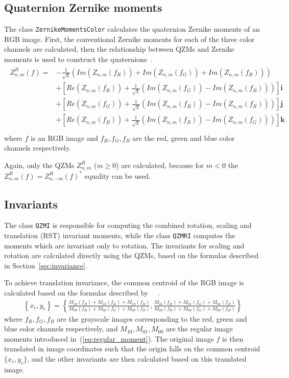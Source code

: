 \subsection{Quaternion Zernike moments}
The class \texttt{ZernikeMomentsColor} calculates the quaternion Zernike moments of an RGB image. First, the conventional Zernike moments for each of the three color channels are calculated, then the relationship between QZMs and Zernike moments is used to construct the quaternions~\cite{qzmi}.
\begin{gather*}
    \begin{split}
        Z_{n,m}^R(f) = &-\frac{1}{\sqrt{3}}\left( Im(Z_{n,m}(f_R)) + Im(Z_{n,m}(f_G)) + Im(Z_{n,m}(f_B)) \right)\\
        &+\left[Re(Z_{n,m}(f_R)) + \frac{1}{\sqrt{3}}\left(Im(Z_{n,m}(f_G)) - Im(Z_{n,m}(f_B))\right)\right]\bm{i}\\
        &+\left[Re(Z_{n,m}(f_G)) + \frac{1}{\sqrt{3}}\left(Im(Z_{n,m}(f_B)) - Im(Z_{n,m}(f_R))\right)\right]\bm{j}\\
        &+\left[Re(Z_{n,m}(f_B)) + \frac{1}{\sqrt{3}}\left(Im(Z_{n,m}(f_R)) - Im(Z_{n,m}(f_G))\right)\right]\bm{k}\\
    \end{split}
\end{gather*}
where $f$ is an RGB image and $f_R, f_G, f_B$ are the red, green and blue color channels respectively.

Again, only the QZMs $Z_{n,m}^R$ ($m \geq 0$) are calculated, because for $m < 0$ the $Z_{n,m}^R(f) = Z_{n,-m}^R(f)^{*}$ equality can be used.

\subsection{Invariants}
The class \texttt{QZMI} is responsible for computing the combined rotation, scaling and translation (RST) invariant moments, while the class \texttt{QZMRI} computes the moments which are invariant only to rotation.
The invariants for scaling and rotation are calculated directly using the QZMs, based on the formulas described in Section~\ref{sec:invariance}.

To achieve translation invariance, the common centroid of the RGB image is calculated based on the formulas described by ~\citeauthor{affine_color}~\cite{affine_color}.
\begin{gather*}
    \left\{x_c,y_c\right\} = \left\{\frac{M_{10}(f_R)+M_{10}(f_G)+M_{10}(f_B)}{M_{00}(f_R)+M_{00}(f_G)+M_{00}(f_B)}, \frac{M_{01}(f_R)+M_{01}(f_G)+M_{01}(f_B)}{M_{00}(f_R)+M_{00}(f_G)+M_{00}(f_B)}\right\}
\end{gather*}
where $f_R, f_G, f_B$ are the grayscale images corresponding to the red, green and blue color channels respectively, and $M_{10}, M_{01}, M_{00}$ are the regular image moments introduced in~(\ref{eq:regular_moment}).
The original image $f$ is then translated in image coordinates such that the origin falls on the common centroid $\{x_c,y_c\}$, and the other invariants are then calculated based on this translated image.


